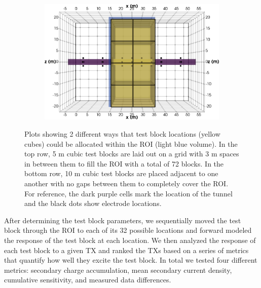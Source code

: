 \documentclass[preprint,authoryear,12pt]{elsarticle}
\begin{document}
\begin{figure}[htp]{}
\begin{center}
\begin{subfigure}{0.54\linewidth}
      \end{subfigure}
      \hspace{-3.0cm}
      \qquad
      \begin{subfigure}{0.54\linewidth}
         \label{fig:SurveyDesign_StraightTunnel_10mTestBlk_South}
         \includegraphics[trim=0cm 0cm 0cm 0cm, clip=true,width=\linewidth]{./figures/Fig18d.png}
      \end{subfigure}
      \vspace{0.2cm}

   \end{center}
\vspace{-0.4cm}
\caption{Plots showing 2 different ways that test block locations (yellow cubes) could be allocated within the ROI (light blue volume). In the top row, 5 m cubic test blocks are laid out on a grid with 3 m spaces in between them to fill the ROI with a total of 72 blocks. In the bottom row, 10 m cubic test blocks are placed adjacent to one another with no gaps between them to completely cover the ROI. For reference, the dark purple cells mark the location of the tunnel and the black dots show electrode locations.}
\label{fig:SurveyDesign_StraightTunnel_TestBlocks}
\end{figure}

After determining the test block parameters, we sequentially moved the test block through the ROI to each of its 32 possible locations and forward modeled the response of the test block at each location. We then analyzed the response of each test block to a given TX and ranked the TXs based on a series of metrics that quantify how well they excite the test block. In total we tested four different metrics: secondary charge accumulation, mean secondary current density, cumulative sensitivity, and measured data differences.
\end{document}
